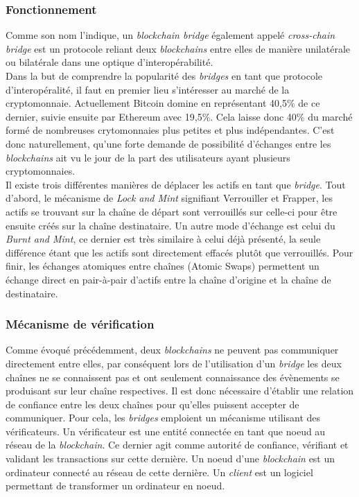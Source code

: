 
\subsubsection{Fonctionnement}

Comme son nom l’indique, un \textit{\gls{blockchain} bridge} également appelé \textit{\gls{cross-chain} bridge} est un protocole reliant deux \textit{\gls{blockchain}s} entre elles de manière unilatérale ou bilatérale dans une optique d’interopérabilité.\\

Dans la but de comprendre la popularité des \textit{bridges} en tant que protocole d’interopéralité, il faut en premier lieu s’intéresser au marché de la cryptomonnaie. Actuellement \gls{Bitcoin} domine en représentant 40,5\% de ce dernier, suivie ensuite par \gls{Ethereum} avec 19,5\%. Cela laisse donc 40\% du marché formé de nombreuses crytomonnaies plus petites et plus indépendantes. C’est donc naturellement, qu’une forte demande de possibilité d’échanges entre les \textit{\gls{blockchain}s} ait vu le jour de la part des utilisateurs ayant plusieurs cryptomonnaies\cite{NgraveNumbers}.\\

Il existe trois différentes manières de déplacer les \gls{actif}s en tant que \textit{bridge}. Tout d’abord, le mécanisme de \textit{Lock and Mint} signifiant Verrouiller et Frapper, les \gls{actif}s se trouvant sur la chaîne de départ sont verrouillés sur celle-ci pour être ensuite créés sur la chaîne destinataire. Un autre mode d'échange est celui du \textit{Burnt and Mint}, ce dernier est très similaire à celui déjà présenté, la seule différence étant que les \gls{actif}s sont directement effacés plutôt que verrouillés. Pour finir, les échanges atomiques entre chaînes (Atomic Swaps) permettent un échange direct en pair-à-pair d'\gls{actif}s entre la chaîne d’origine et la chaîne de destinataire.\cite{EthereumMechanism}

\subsubsection{Mécanisme de vérification}

Comme évoqué précédemment, deux \textit{\gls{blockchain}s} ne peuvent pas communiquer directement entre elles, par conséquent lors de l’utilisation d’un \textit{bridge} les deux chaînes ne se connaissent pas et ont seulement connaissance des évènements se produisant sur leur chaîne respectives. Il est donc nécessaire d’établir une relation de confiance entre les deux chaînes pour qu’elles puissent accepter de communiquer. Pour cela, les \textit{bridges} emploient un mécanisme utilisant des \gls{vérificateur}s. Un \gls{vérificateur} est une entité connectée en tant que \gls{noeud} au réseau de la \textit{blockchain}. Ce dernier agit comme autorité de confiance, vérifiant et validant les transactions sur cette dernière. Un noeud d'une \textit{blockchain} est un ordinateur connecté au réseau de cette dernière. Un \textit{client} est un logiciel permettant de transformer un ordinateur en noeud. \cite{EthereumNodeClient} \\


